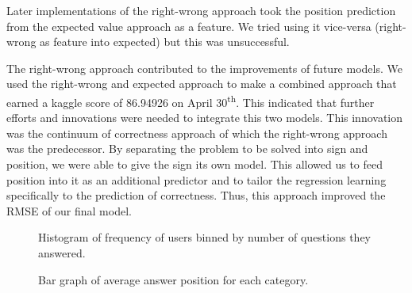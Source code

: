 \documentclass[letterpaper]{article}
\begin{document}
Later implementations of the right-wrong approach took the position prediction from the expected value approach as a feature. We tried using it vice-versa (right-wrong as feature into expected) but this was unsuccessful.

The right-wrong approach contributed to the improvements of future models. We used the right-wrong and expected approach to make a combined approach that earned a kaggle score of 86.94926 on April 30\textsuperscript{th}. This indicated that further efforts and innovations were needed to integrate this two models. This innovation was the continuum of correctness approach of which the right-wrong approach was the predecessor. By separating the problem to be solved into sign and position, we were able to give the sign its own model. This allowed us to feed position into it as an additional predictor and to tailor the regression learning specifically to the prediction of correctness. Thus, this approach improved the RMSE of our final model.



\begin{figure}[H]
	\begin{center}
	\end{center}
	\caption{Histogram of frequency of users binned by number of questions they answered.}
	\label{fig:userHisto}
\end{figure}

\begin{figure}[H]
	\begin{center}
	\end{center}
	\caption{Bar graph of average answer position for each category.}
	\label{fig:categoryAverages}
\end{figure}
\end{document}
